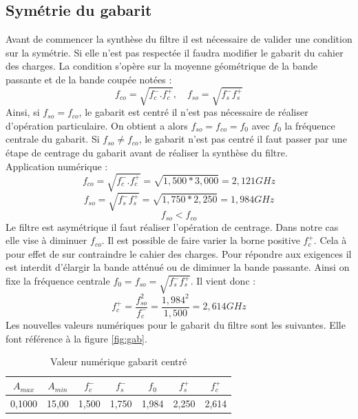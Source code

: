 \documentclass[french]{article}
\begin{document}
\subsection{Symétrie du gabarit}
Avant de commencer la synthèse du filtre il est nécessaire de valider une condition sur la symétrie. Si elle n'est pas respectée il faudra modifier le gabarit du cahier des charges. La condition s'opère sur la moyenne géométrique de la bande passante et de la bande coupée notées :
\begin{equation}
	 f_{co} = \sqrt{f_c^-.f_c^+}, \quad f_{so} = \sqrt{f_s^- f_s^+}
\end{equation}
Ainsi, si $f_{so} = f_{co}$, le gabarit est centré il n'est pas nécessaire de réaliser d'opération particulaire. On obtient a alors  $f_{so} = f_{co} = f_0$ avec $f_0$ la fréquence centrale du gabarit. Si $f_{so} \neq f_{co}$, le gabarit n'est pas centré il faut passer par une étape de centrage du gabarit avant de réaliser la synthèse du filtre.\\
Application numérique :\\
\begin{equation}
f_{co} = \sqrt{f_c^-.f_c^+} = \sqrt{1,500*3,000} = 2,121 GHz
\end{equation}
\begin{equation}
	f_{so} = \sqrt{f_s^- f_s^+} = \sqrt{1,750*2,250} = 1,984 GHz
\end{equation}
\begin{equation}
f_{so} <	f_{co}
\end{equation}
Le filtre est asymétrique il faut réaliser l'opération de centrage. Dans notre cas elle vise à diminuer $f_{co}$. Il est possible de faire varier la borne positive $f_c^+$. Cela à pour effet de sur contraindre le cahier des charges. Pour répondre aux exigences il est interdit d'élargir la bande atténué ou de diminuer la bande passante. Ainsi on fixe la fréquence centrale $f_0 = f_{so} = \sqrt{f_s^- f_s^+}$.  
Il vient donc :
\begin{equation}
f_c^+=\frac{f_{so}^2}{f_c^-}=\frac{1,984^2}{1,500}=2,614GHz
\end{equation}
Les nouvelles valeurs numériques pour le gabarit du filtre sont les suivantes. Elle font référence à la figure \ref{fig:gab}.
	\begin{table}[H]
	\centering
	\begin{tabular}{|c|c|c|c|c|c|c|}
		\hline
		$A_{max}$& $A_{min}$ & $f_c^-$ & $f_s^-$ & $f_0$ & $f_s^+$ &$f_c^+$ \\ \hline
		0,1000		 & 15,00 		& 1,500	   & 1,750 & 1,984 & 2,250& 2,614 \\ \hline
	\end{tabular}
	\caption{Valeur numérique gabarit centré}
\end{table}
\end{document}

